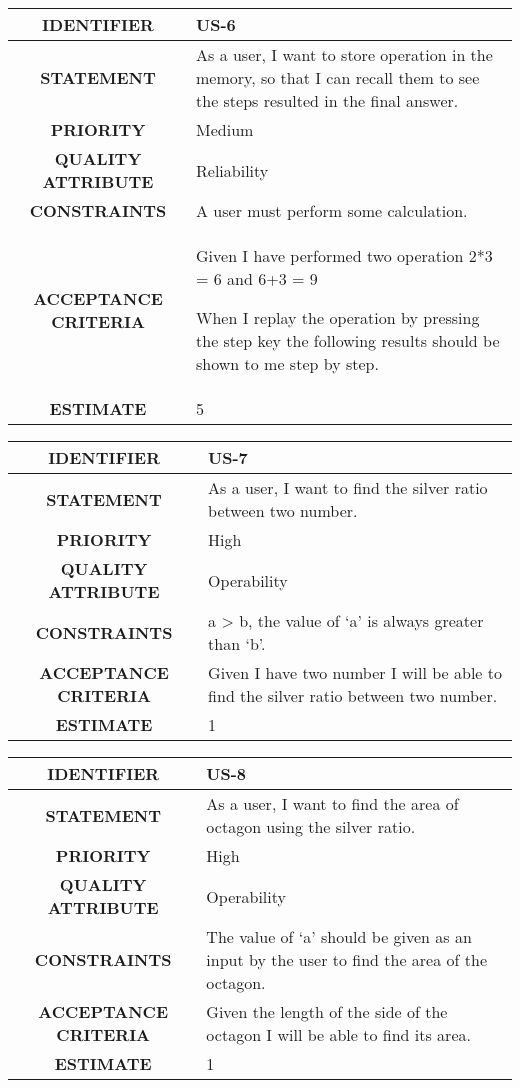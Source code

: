 \documentclass[12pt, a4paper]{article}
\begin{document}
\begin{tabular}{|c|p{10cm}|}
    \hline
    \textbf{IDENTIFIER}     & US-6 \\
    \hline
    \textbf{STATEMENT} & As a user, I want to store operation in the memory, so that I can recall them to see the steps resulted in the final answer.\\
    \hline
    \textbf{PRIORITY}     & Medium \\
    \hline
    \textbf{QUALITY ATTRIBUTE}     & Reliability \\
    \hline
    \textbf{CONSTRAINTS}     & A user must perform some calculation.\\
    \hline
    \textbf{ACCEPTANCE CRITERIA} &   Given I have performed two operation 2*3 = 6 and 6+3 = 9
    
    When I replay the operation by pressing the step key the following results should be shown to me step by step.
\\
    \hline
    \textbf{ESTIMATE}     & 5 \\
    \hline 
\end{tabular}

\newpage
\vspace*{0.8 cm}

\begin{tabular}{|c|p{10cm}|}
    \hline
    \textbf{IDENTIFIER}     & US-7 \\
    \hline
    \textbf{STATEMENT} & As a user, I want to find the silver ratio between two number.\\
    \hline
    \textbf{PRIORITY}     & High \\
    \hline
    \textbf{QUALITY ATTRIBUTE }    & Operability \\
    \hline
    \textbf{CONSTRAINTS}     & a > b, the value of ‘a’ is always greater than ‘b’.\\
    \hline
    \textbf{ACCEPTANCE CRITERIA} &   Given I have two number I will be able to find the silver ratio between two number.\\
    \hline
    \textbf{ESTIMATE}     & 1 \\
    \hline 
\end{tabular}

\vspace*{2 cm}

\begin{tabular}{|c|p{10cm}|}
    \hline
    \textbf{IDENTIFIER}     & US-8 \\
    \hline
    \textbf{STATEMENT} & As a user, I want to find the area of octagon using the silver ratio.\\
    \hline
    \textbf{PRIORITY}     & High \\
    \hline
    \textbf{QUALITY ATTRIBUTE}     & Operability \\
    \hline
    \textbf{CONSTRAINTS}     & The value of ‘a’ should be given as an input by the user to find the area of the octagon.\\
    \hline
    \textbf{ACCEPTANCE CRITERIA} &   Given the length of the side of the octagon I will be able to find its area.\\
    \hline
    \textbf{ESTIMATE}     & 1 \\
    \hline 
\end{tabular}
\end{document}
